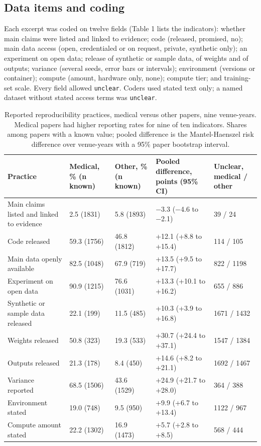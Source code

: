\documentclass[11pt]{article}
\begin{document}
\subsection*{Data items and coding}
Each excerpt was coded on twelve fields (Table 1 lists the indicators): whether main claims were listed and linked to evidence; code (released, promised, no); main data access (open, credentialed or on request, private, synthetic only); an experiment on open data; release of synthetic or sample data, of weights and of outputs; variance (several seeds, error bars or intervals); environment (versions or container); compute (amount, hardware only, none); compute tier; and training-set scale. Every field allowed \texttt{unclear}. Coders used stated text only; a named dataset without stated access terms was \texttt{unclear}.

\begin{table}[htbp]
\centering\footnotesize
\renewcommand{\thetable}{1}
\caption{Reported reproducibility practices, medical versus other papers, nine venue-years. Medical papers had higher reporting rates for nine of ten indicators. Shares among papers with a known value; pooled difference is the Mantel-Haenszel risk difference over venue-years with a 95\% paper bootstrap interval.}\label{tab:table1}
\begin{tabularx}{\textwidth}{XL{1.75cm}L{1.75cm}L{3.55cm}L{1.75cm}}
\toprule
\textbf{Practice} & \textbf{Medical, \% (n known)} & \textbf{Other, \% (n known)} & \textbf{Pooled difference, points (95\% CI)} & \textbf{Unclear, medical / other} \\ \midrule
Main claims listed and linked to evidence & 2.5 (1831) & 5.8 (1893) & −3.3 (−4.6 to −2.1) & 39 / 24 \\
Code released & 59.3 (1756) & 46.8 (1812) & +12.1 (+8.8 to +15.4) & 114 / 105 \\
Main data openly available & 82.5 (1048) & 67.9 (719) & +13.5 (+9.5 to +17.7) & 822 / 1198 \\
Experiment on open data & 90.9 (1215) & 76.6 (1031) & +13.3 (+10.1 to +16.2) & 655 / 886 \\
Synthetic or sample data released & 22.1 (199) & 11.5 (485) & +10.3 (+3.9 to +16.8) & 1671 / 1432 \\
Weights released & 50.8 (323) & 19.3 (533) & +30.7 (+24.4 to +37.1) & 1547 / 1384 \\
Outputs released & 21.3 (178) & 8.4 (450) & +14.6 (+8.2 to +21.1) & 1692 / 1467 \\
Variance reported & 68.5 (1506) & 43.6 (1529) & +24.9 (+21.7 to +28.0) & 364 / 388 \\
Environment stated & 19.0 (748) & 9.5 (950) & +9.9 (+6.7 to +13.4) & 1122 / 967 \\
Compute amount stated & 22.2 (1302) & 16.9 (1473) & +5.7 (+2.8 to +8.5) & 568 / 444 \\
\bottomrule
\end{tabularx}
\end{table}
\end{document}

